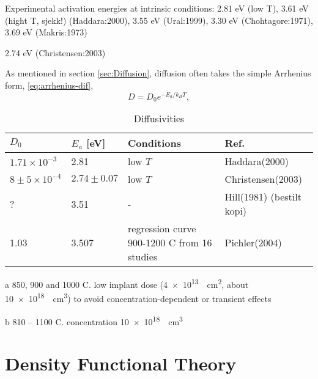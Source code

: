 \documentclass[11pt,bibliography=totoc,index=totoc]{scrbook}   %
\begin{document}
Experimental activation energies at intrinsic conditions: 2.81 eV (low T), 3.61 eV (hight T, sjekk!) (Haddara:2000), 3.55 eV (Ural:1999), 3.30 eV (Chohtagore:1971), 3.69 eV (Makris:1973)

2.74 eV (Christensen:2003)

As mentioned in section \ref{sec:Diffusion}, diffusion often takes the simple Arrhenius form, \eqref{eq:arrhenius-dif},
\begin{equation*}
    D = D_0 e^{-E_a/k_BT},
\end{equation*}


\begin{table}[htbp]
  \centering
  \begin{threeparttable}[htbp]
  \begin{tabular}{llll}
      \toprule
        $D_0$ & $E_a$ [eV] & Conditions & Ref. \\
      \midrule
      $1.71\times 10^{-3}$ & 2.81 & low $T$\tnote{a} & Haddara(2000)\cite{Haddara:2000} \\
      $8\pm5\times 10^{-4}$ & $2.74\pm 0.07$ & low $T$\tnote{b} & Christensen(2003)\cite{Christensen:2003} \\
      ? & 3.51 & - & Hill(1981) (bestilt kopi) \\
      1.03 & 3.507 & regression curve 900-1200 C from 16 studies & Pichler(2004)\cite{Pichler:2004} \\
      \bottomrule
    \end{tabular}
    {\footnotesize
        \begin{tablenotes}
          \item[a] 850, 900 and 1000 C.
            low implant dose (\SI{4e13}{\per\centi\metre\squared}, about \SI{10e18}{\per\centi\metre\cubed}) to 
            avoid concentration-dependent or transient effects
          \item[b] 810 – 1100 C. concentration \SI{10e18}{\per\centi\metre\cubed}
        \end{tablenotes}
    }
  \end{threeparttable}
  \caption{Diffusivities}
  \label{tab:Label}
\end{table}


%
\chapter{Density Functional Theory}\label{cha:DFT}
%
\end{document}
